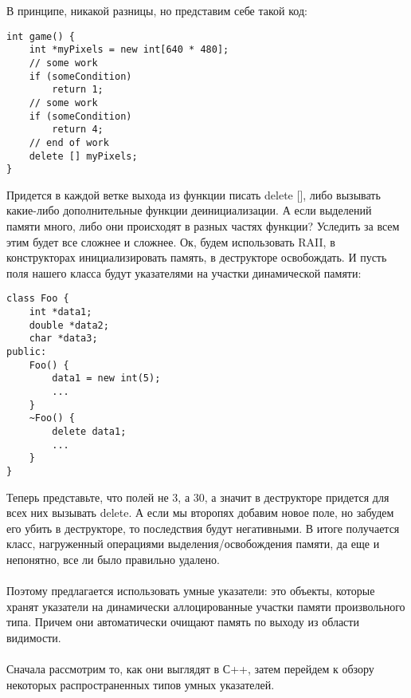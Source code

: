 ﻿\documentclass {article}
\begin{document}
В принципе, никакой разницы, но представим себе такой код:
\begin{lstlisting}[caption=Пример]
int game() {
    int *myPixels = new int[640 * 480];
    // some work
    if (someCondition)
        return 1;        
    // some work
    if (someCondition)
        return 4;        
    // end of work
    delete [] myPixels;
}
\end{lstlisting}
Придется в каждой ветке выхода из функции писать delete [], либо вызывать какие-либо дополнительные функции деинициализации. А если выделений памяти много, либо они происходят в разных частях функции? Уследить за всем этим будет все сложнее и сложнее. Ок, будем использовать RAII, в конструкторах инициализировать память, в деструкторе освобождать. И пусть поля нашего класса будут указателями на участки динамической памяти:
\begin{lstlisting}[caption=Пример]
class Foo {
    int *data1;
    double *data2;
    char *data3;
public:
    Foo() {
        data1 = new int(5);
        ...
    }
    ~Foo() {
        delete data1;
        ...
    }
}
\end{lstlisting}
Теперь представьте, что полей не 3, а 30, а значит в деструкторе придется для всех них вызывать delete. А если мы второпях добавим новое поле, но забудем его убить в деструкторе, то последствия будут негативными. В итоге получается класс, нагруженный операциями выделения/освобождения памяти, да еще и непонятно, все ли было правильно удалено.\\\\
Поэтому предлагается использовать умные указатели: это объекты, которые хранят указатели на динамически аллоцированные участки памяти произвольного типа. Причем они автоматически очищают память по выходу из области видимости.\\\\
Сначала рассмотрим то, как они выглядят в С++, затем перейдем к обзору некоторых распространенных типов умных указателей.
\end{document}
